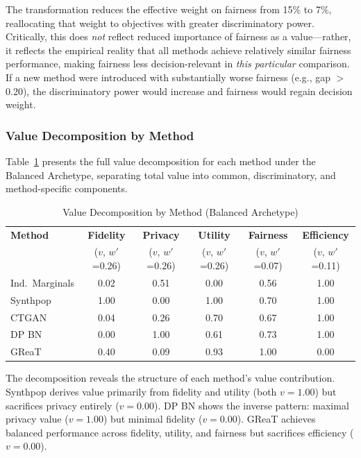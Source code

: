 \documentclass[12pt,a4paper]{article}
\begin{document}
The transformation reduces the effective weight on fairness from 15\% to 7\%, reallocating that weight to objectives with greater discriminatory power. Critically, this does \textit{not} reflect reduced importance of fairness as a value---rather, it reflects the empirical reality that all methods achieve relatively similar fairness performance, making fairness less decision-relevant in \textit{this particular} comparison. If a new method were introduced with substantially worse fairness (e.g., gap $>$ 0.20), the discriminatory power would increase and fairness would regain decision weight.

\subsubsection{Value Decomposition by Method}

Table~\ref{tab:value_decomp} presents the full value decomposition for each method under the Balanced Archetype, separating total value into common, discriminatory, and method-specific components.

\begin{table}[htbp]
\centering
\caption{Value Decomposition by Method (Balanced Archetype)}
\label{tab:value_decomp}
\begin{tabular}{@{}lccccc@{}}
\toprule
\textbf{Method} & \textbf{Fidelity} & \textbf{Privacy} & \textbf{Utility} & \textbf{Fairness} & \textbf{Efficiency} \\
& ($v$, $w'$=0.26) & ($v$, $w'$=0.26) & ($v$, $w'$=0.26) & ($v$, $w'$=0.07) & ($v$, $w'$=0.11) \\
\midrule
Ind.\ Marginals & 0.02 & 0.51 & 0.00 & 0.56 & 1.00 \\
Synthpop & 1.00 & 0.00 & 1.00 & 0.70 & 1.00 \\
CTGAN & 0.04 & 0.26 & 0.70 & 0.67 & 1.00 \\
DP BN & 0.00 & 1.00 & 0.61 & 0.73 & 1.00 \\
GReaT & 0.40 & 0.09 & 0.93 & 1.00 & 0.00 \\
\bottomrule
\end{tabular}
\end{table}

The decomposition reveals the structure of each method's value contribution. Synthpop derives value primarily from fidelity and utility (both $v = 1.00$) but sacrifices privacy entirely ($v = 0.00$). DP BN shows the inverse pattern: maximal privacy value ($v = 1.00$) but minimal fidelity ($v = 0.00$). GReaT achieves balanced performance across fidelity, utility, and fairness but sacrifices efficiency ($v = 0.00$).
\end{document}
